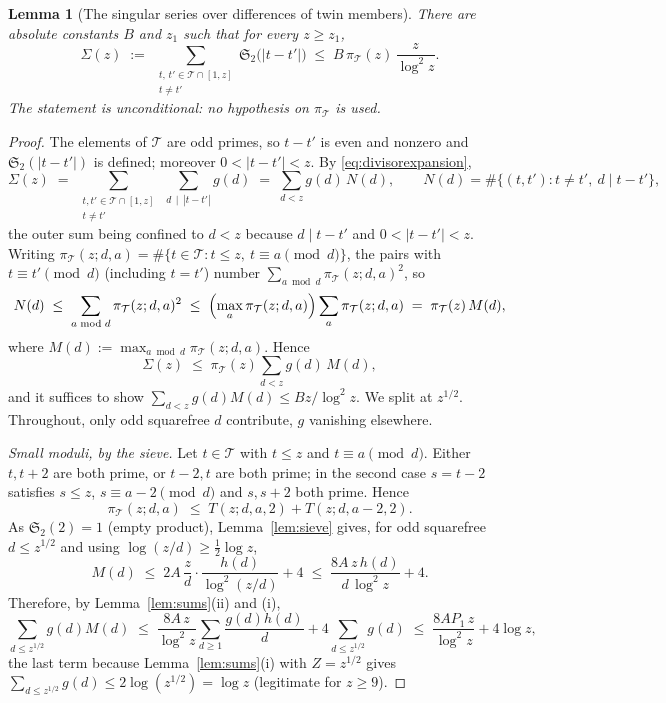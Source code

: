 \documentclass[10pt]{article}
\newtheorem{lemma}{Lemma}
\theoremstyle{definition}
\theoremstyle{remark}
\newcommand{\T}{\mathcal{T}}
\begin{document}
\begin{lemma}[The singular series over differences of twin members]
\label{lem:crux}
There are absolute constants $B$ and $z_1$ such that for every $z \ge z_1$,
\[
  \Sigma(z) \;:=\;
  \sum_{\substack{t,\, t' \in \T \cap [1,z] \\ t \ne t'}}
    \mathfrak{S}_2\bigl(|t - t'|\bigr)
  \;\le\; B\,\pi_\T(z)\,\frac{z}{\log^{2} z}.
\]
The statement is unconditional: no hypothesis on $\pi_\T$ is used.
\end{lemma}

\begin{proof}
The elements of $\T$ are odd primes, so $t - t'$ is even and nonzero and
$\mathfrak{S}_2(|t-t'|)$ is defined; moreover $0 < |t-t'| < z$. By
\eqref{eq:divisorexpansion},
\[
  \Sigma(z) \;=\; \sum_{\substack{t,t' \in \T\cap[1,z] \\ t \ne t'}}
    \ \sum_{d \,\mid\, |t-t'|} g(d)
  \;=\; \sum_{d < z} g(d)\, N(d),
  \qquad
  N(d) = \#\{(t,t') : t \ne t',\ d \mid t-t'\},
\]
the outer sum being confined to $d < z$ because $d \mid t-t'$ and
$0 < |t-t'| < z$. Writing
$\pi_\T(z;d,a) = \#\{t \in \T : t \le z,\ t \equiv a \!\pmod d\}$, the pairs
with $t \equiv t' \pmod d$ (including $t = t'$) number
$\sum_{a \bmod d}\pi_\T(z;d,a)^{2}$, so
\[
  N(d) \;\le\; \sum_{a \bmod d}\pi_\T(z;d,a)^{2}
  \;\le\; \Bigl(\max_{a}\pi_\T(z;d,a)\Bigr)\sum_{a}\pi_\T(z;d,a)
  \;=\; \pi_\T(z)\,M(d),
\]
where $M(d) := \max_{a \bmod d}\pi_\T(z;d,a)$. Hence
\begin{equation}\label{eq:SigmaM}
  \Sigma(z) \;\le\; \pi_\T(z) \sum_{d < z} g(d)\, M(d),
\end{equation}
and it suffices to show $\sum_{d<z} g(d)M(d) \le B z/\log^{2}z$. We split at
$z^{1/2}$. Throughout, only odd squarefree $d$ contribute, $g$ vanishing
elsewhere.

\emph{Small moduli, by the sieve.} Let $t \in \T$ with $t \le z$ and
$t \equiv a \pmod d$. Either $t, t+2$ are both prime, or $t-2, t$ are both
prime; in the second case $s = t-2$ satisfies $s \le z$, $s \equiv a-2 \pmod d$
and $s, s+2$ both prime. Hence
\[
  \pi_\T(z;d,a) \;\le\; T(z;d,a,2) + T(z;d,a-2,2).
\]
As $\mathfrak{S}_2(2) = 1$ (empty product), Lemma~\ref{lem:sieve} gives, for
odd squarefree $d \le z^{1/2}$ and using $\log(z/d) \ge \tfrac12\log z$,
\[
  M(d) \;\le\; 2A\,\frac{z}{d}\cdot\frac{h(d)}{\log^{2}(z/d)} + 4
  \;\le\; \frac{8A\,z\,h(d)}{d\,\log^{2}z} + 4 .
\]
Therefore, by Lemma~\ref{lem:sums}(ii) and (i),
\begin{equation}\label{eq:M1}
  \sum_{d \le z^{1/2}} g(d)M(d)
  \;\le\; \frac{8A\,z}{\log^{2}z}\sum_{d\ge1}\frac{g(d)h(d)}{d}
    + 4\sum_{d \le z^{1/2}} g(d)
  \;\le\; \frac{8AP_1\,z}{\log^{2}z} + 4\log z ,
\end{equation}
the last term because Lemma~\ref{lem:sums}(i) with $Z = z^{1/2}$ gives
$\sum_{d \le z^{1/2}} g(d) \le 2\log(z^{1/2}) = \log z$ (legitimate for
$z \ge 9$).


\end{proof}
\end{document}
